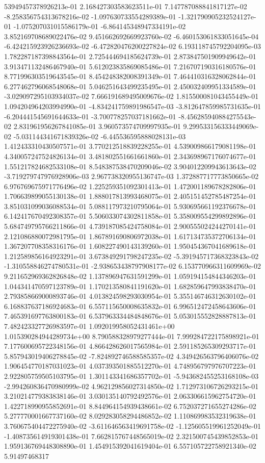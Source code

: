 53949457378926213e-01	2.168427303583623511e-01	7.147787088841817127e-02	-8.258356754313678216e-02	-1.097630733554289389e-01	-1.321790905232524127e-01	-1.075207031015586179e-01	-6.864145348947334191e-02	3.852169708689022476e-02	9.451662692669923760e-02	-6.460153061833051645e-04	-6.424215923926236693e-02	-6.472820476200227824e-02	6.193118745792204095e-03	1.782287187398843564e-01	2.725444694185624739e-01	2.873847501909949642e-01	3.913471132486467940e-01	5.612023835869085486e-01	7.216707190316180576e-01	8.771996303519643545e-01	8.454248382008391349e-01	7.464410316328062844e-01	6.277462796068548068e-01	5.046251643499235495e-01	2.450032409951334589e-01	-3.029097295103934037e-02	7.666191689495009676e-02	1.815500081043455449e-01	1.094204964203994990e-01	-4.834241759891986547e-03	-3.812647859985731635e-01	-6.204441545691644633e-01	-3.700778257037181662e-01	-8.456285940884275543e-02	2.831961956267841085e-01	3.960573574709997935e-01	9.299533156333449069e-02	-5.031144341671839326e-02	-6.445536595888028131e-03	1.412433310430507571e-01	3.770212518839228255e-01	4.539009866179081198e-01	4.340057247524826134e-01	3.481802551661661860e-01	2.343698967176074677e-01	1.551217824682533108e-01	8.548387538470209046e-02	3.904012209943613643e-02	-3.719279747976928906e-03	2.967738320955136747e-03	1.372887717773850665e-02	6.976769675971776496e-02	1.225259351092301413e-01	1.472001189678282806e-01	1.706639899055130138e-01	1.888017813993468075e-01	2.405151452785487254e-01	3.851031099036088534e-01	5.088117973210795064e-01	5.930695661192376678e-01	6.142417670492308357e-01	5.506033074302811858e-01	5.358009554299892896e-01	5.684749795766211866e-01	4.739187085424758084e-01	2.900555024244270141e-01	2.121086880072981795e-01	1.867891690806972038e-01	1.617134735372706134e-01	1.367207708358316176e-01	1.608227490143139260e-01	1.950454367041689618e-01	1.212589856164923291e-01	3.673849291798247235e-02	-5.391945717368323843e-02	-1.310558846274780531e-01	-2.938653438797908177e-02	6.153770966311609969e-02	9.211652969362826848e-02	1.137896947631591299e-01	1.059194154844346203e-01	1.044341470597123789e-01	1.170213580841191620e-01	1.682859647993838470e-01	2.793858669000893746e-01	4.013824598293030954e-01	5.355146746312630102e-01	6.168837637186924683e-01	6.557115650008635832e-01	6.996512472458643606e-01	7.465391697763800183e-01	6.537963334484848676e-01	5.053015552828887813e-01	7.482423327726983597e-01	1.092019958052431461e+00	1.015390284944289734e+00	8.790588328979277444e-01	7.999284722175898921e-01	7.177600695722348156e-01	4.866428626017565984e-01	2.591185265309293717e-01	5.857943019406278845e-02	-7.824892746588585357e-02	4.349426563796406076e-02	1.906454770187031023e-01	4.037393501885512270e-01	4.748956797976707223e-01	2.922805759505103795e-01	1.301143341686357702e-01	-5.943682455253168108e-03	-2.994260836470980999e-02	4.962129856027314850e-02	1.712973106726293215e-01	3.210214779383838146e-01	3.030135140792492576e-01	2.063306615962754720e-01	1.422718990955852691e-01	8.844964154939438661e-02	6.752037271655274286e-02	5.277770001667737160e-02	8.029283058294486852e-02	1.110869983532319638e-01	3.760675404472275940e-02	-3.611646563419691758e-02	-1.125605519961252049e-01	-1.408735614919301438e-01	7.662815767448565019e-02	2.321500745439852853e-01	1.959136769448308890e-01	1.454915392041619404e-01	6.557105722758921340e-02	5.91497468317